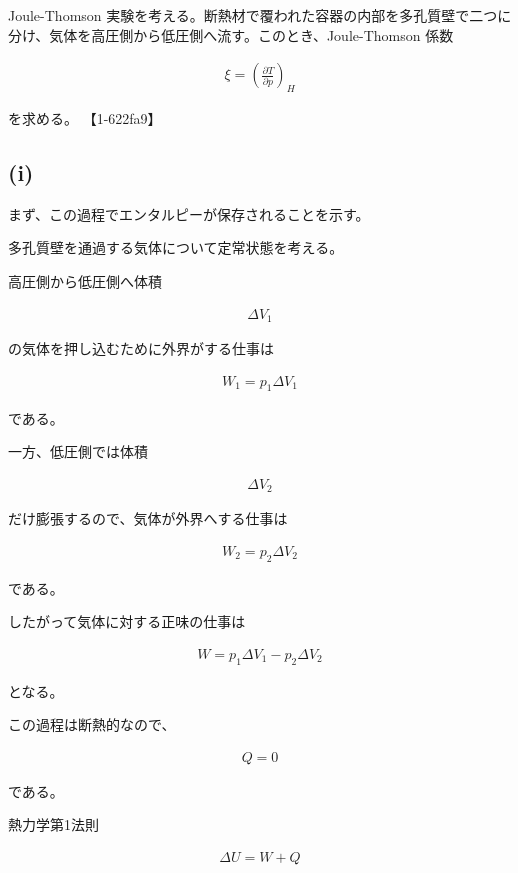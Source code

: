 \documentclass[platex,dvipdfmx,a4paper]{jsarticle}
\begin{document}
Joule-Thomson 実験を考える。断熱材で覆われた容器の内部を多孔質壁で二つに分け、気体を高圧側から低圧側へ流す。このとき、Joule-Thomson 係数

\begin{align*}
\xi
=
\left(
\frac{\partial T}{\partial p}
\right)_H
\end{align*}

を求める。 【1-622fa9】

\subsection{(i)}

まず、この過程でエンタルピーが保存されることを示す。

多孔質壁を通過する気体について定常状態を考える。

高圧側から低圧側へ体積

\begin{align*}
\Delta V_1
\end{align*}

の気体を押し込むために外界がする仕事は

\begin{align*}
W_1=p_1\Delta V_1
\end{align*}

である。

一方、低圧側では体積

\begin{align*}
\Delta V_2
\end{align*}

だけ膨張するので、気体が外界へする仕事は

\begin{align*}
W_2=p_2\Delta V_2
\end{align*}

である。

したがって気体に対する正味の仕事は

\begin{align*}
W=p_1\Delta V_1-p_2\Delta V_2
\end{align*}

となる。

この過程は断熱的なので、

\begin{align*}
Q=0
\end{align*}

である。

熱力学第1法則

\begin{align*}
\Delta U=W+Q
\end{align*}
\end{document}

